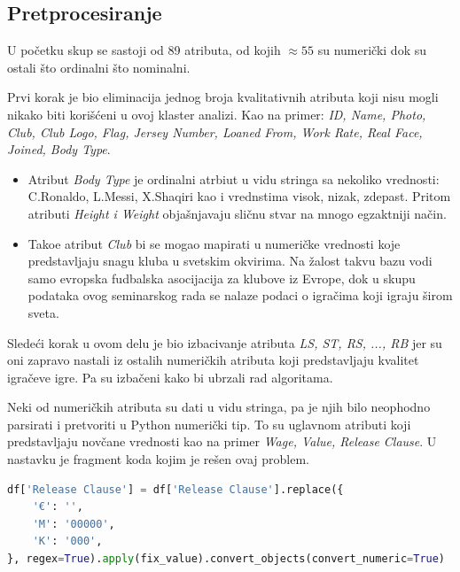 \documentclass[a4paper, 11pt]{article}
\begin{document}
\subsection{Pretprocesiranje}
U po\v{c}etku skup se sastoji od 89 atributa, od kojih $\approx 55 $ su numeri\v{c}ki
dok su ostali \v{s}to ordinalni \v{s}to nominalni.
 
Prvi korak je bio eliminacija jednog broja kvalitativnih atributa koji nisu mogli nikako
biti kori\v{s}\'{c}eni u ovoj klaster analizi. Kao na primer:
\emph{ID, Name, Photo, Club, Club Logo, Flag, Jersey Number, Loaned From, Work Rate, Real Face, 
Joined, Body Type}. \\

\begin{itemize}



\item Atribut \emph{Body Type} je ordinalni atrbiut u vidu stringa sa nekoliko vrednosti: C.Ronaldo, L.Messi, X.Shaqiri kao i vrednstima visok, nizak, zdepast. Pritom atributi \emph{Height i Weight} obja\v{s}njavaju
sli\v{c}nu stvar na mnogo egzaktniji na\v{c}in. \\
\item Tako\dj{}e atribut \emph{Club} bi se mogao mapirati u numeri\v{c}ke vrednosti koje predstavljaju
snagu kluba u svetskim okvirima. Na \v{z}alost takvu bazu vodi samo evropska fudbalska asocijacija za 
klubove iz Evrope, dok u skupu podataka ovog seminarskog rada se nalaze podaci o
igra\v{c}ima koji igraju \v{s}irom sveta.

\end{itemize}


Slede\'{c}i korak u ovom delu je bio izbacivanje atributa \emph{LS, ST, RS, ..., RB} jer su oni zapravo
nastali iz ostalih numeri\v{c}kih atributa koji predstavljaju kvalitet igra\v{c}eve igre. Pa su izba\v{c}eni
kako bi ubrzali rad algoritama.

Neki od numeri\v{c}kih atributa su dati u vidu stringa, pa je njih bilo neophodno parsirati i pretvoriti u 
Python numeri\v{c}ki tip. To su uglavnom atributi koji predstavljaju nov\v{c}ane vrednosti
kao na primer \emph{Wage, Value, Release Clause}.
U nastavku je fragment koda kojim je re\v{s}en ovaj problem.

\begin{lstlisting}[language=Python] 
df['Release Clause'] = df['Release Clause'].replace({
    '€': '',
    'M': '00000',
    'K': '000',
}, regex=True).apply(fix_value).convert_objects(convert_numeric=True)
\end{lstlisting}
\end{document}
